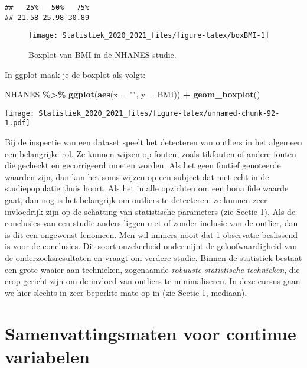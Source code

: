 \documentclass[
  12pt,dutch,coursenotes]{book}
\newenvironment{Shaded}{\begin{snugshade}}{\end{snugshade}}
\newcommand{\DataTypeTok}[1]{\textcolor[rgb]{0.13,0.29,0.53}{#1}}
\newcommand{\KeywordTok}[1]{\textcolor[rgb]{0.13,0.29,0.53}{\textbf{#1}}}
\newcommand{\NormalTok}[1]{#1}
\newcommand{\OperatorTok}[1]{\textcolor[rgb]{0.81,0.36,0.00}{\textbf{#1}}}
\newcommand{\StringTok}[1]{\textcolor[rgb]{0.31,0.60,0.02}{#1}}
\theoremstyle{definition}
\theoremstyle{definition}
\theoremstyle{definition}
\theoremstyle{remark}
\begin{document}
\begin{verbatim}
##   25%   50%   75% 
## 21.58 25.98 30.89
\end{verbatim}

\begin{figure}

{\centering \texttt{[image: Statistiek\_2020\_2021\_files/figure-latex/boxBMI-1]} 

}

\caption{Boxplot van BMI in de NHANES studie.}\label{fig:boxBMI}
\end{figure}

In ggplot maak je de boxplot als volgt:

\begin{Shaded}
\begin{Highlighting}[]
\NormalTok{NHANES }\OperatorTok{\%\textgreater{}\%}\StringTok{ }\KeywordTok{ggplot}\NormalTok{(}\KeywordTok{aes}\NormalTok{(}\DataTypeTok{x =} \StringTok{""}\NormalTok{, }\DataTypeTok{y =}\NormalTok{ BMI)) }\OperatorTok{+}\StringTok{ }\KeywordTok{geom\_boxplot}\NormalTok{()}
\end{Highlighting}
\end{Shaded}

\texttt{[image: Statistiek\_2020\_2021\_files/figure-latex/unnamed-chunk-92-1.pdf]}

Bij de inspectie van een dataset speelt het detecteren van outliers in het
algemeen een belangrijke rol. Ze kunnen wijzen op fouten, zoals tikfouten of
andere fouten die gecheckt en gecorrigeerd moeten worden. Als het geen
foutief genoteerde waarden zijn, dan kan het soms wijzen op een subject dat niet
echt in de studiepopulatie thuis hoort. Als het in
alle opzichten om een bona fide waarde gaat, dan nog is het belangrijk om
outliers te detecteren: ze kunnen zeer invloedrijk zijn op de schatting van
statistische parameters (zie Sectie \ref{sec:summarize}). Als de conclusies
van een studie anders liggen met of zonder inclusie van de outlier, dan is
dit een ongewenst fenomeen. Men wil immers nooit dat 1 observatie beslissend
is voor de conclusies. Dit soort onzekerheid ondermijnt de geloofwaardigheid
van de onderzoeksresultaten en vraagt om verdere studie. Binnen de
statistiek bestaat een grote waaier aan technieken, zogenaamde
\emph{robuuste statistische technieken}, die erop gericht zijn om de invloed van
outliers te minimaliseren. In deze cursus gaan we hier slechts in zeer
beperkte mate op in (zie Sectie \ref{sec:summarize}, mediaan).

\hypertarget{sec:summarize}{%
\section{Samenvattingsmaten voor continue variabelen}\label{sec:summarize}}
\end{document}
